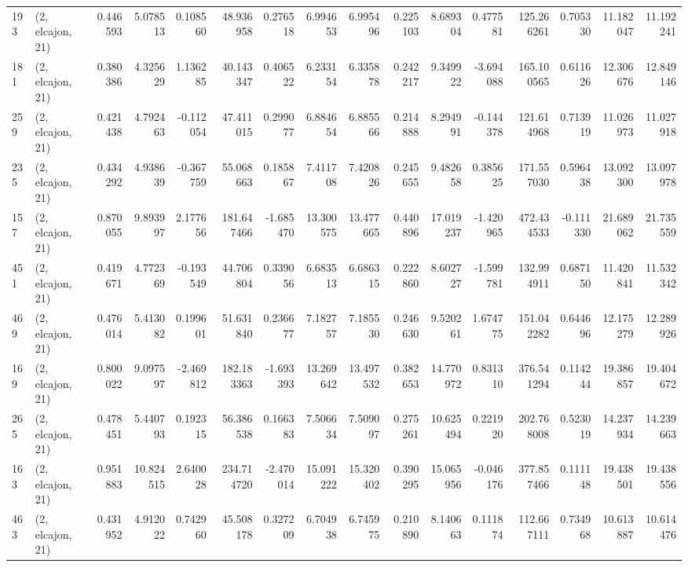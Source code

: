 \begin{tabular}{llrrrrrrrrrrrrrr}
193 &  (2, elcajon, 21) &   0.446593 &   5.078513 &   0.108560 &    48.936958 &   0.276518 &   6.994653 &   6.995496 &  0.225103 &   8.689304 &   0.477581 &   125.266261 &   0.705330 &  11.182047 &  11.192241 \\
181 &  (2, elcajon, 21) &   0.380386 &   4.325629 &   1.136285 &    40.143347 &   0.406522 &   6.233154 &   6.335878 &  0.242217 &   9.349922 &  -3.694088 &   165.100565 &   0.611626 &  12.306676 &  12.849146 \\
259 &  (2, elcajon, 21) &   0.421438 &   4.792463 &  -0.112054 &    47.411015 &   0.299077 &   6.884654 &   6.885566 &  0.214888 &   8.294991 &  -0.144378 &   121.614968 &   0.713919 &  11.026973 &  11.027918 \\
235 &  (2, elcajon, 21) &   0.434292 &   4.938639 &  -0.367759 &    55.068663 &   0.185867 &   7.411708 &   7.420826 &  0.245655 &   9.482658 &   0.385625 &   171.557030 &   0.596438 &  13.092300 &  13.097978 \\
157 &  (2, elcajon, 21) &   0.870055 &   9.893997 &   2.177656 &   181.647466 &  -1.685470 &  13.300575 &  13.477665 &  0.440896 &  17.019237 &  -1.420965 &   472.434533 &  -0.111330 &  21.689062 &  21.735559 \\
451 &  (2, elcajon, 21) &   0.419671 &   4.772369 &  -0.193549 &    44.706804 &   0.339056 &   6.683513 &   6.686315 &  0.222860 &   8.602727 &  -1.599781 &   132.994911 &   0.687150 &  11.420841 &  11.532342 \\
469 &  (2, elcajon, 21) &   0.476014 &   5.413082 &   0.199601 &    51.631840 &   0.236677 &   7.182757 &   7.185530 &  0.246630 &   9.520261 &   1.674775 &   151.042282 &   0.644696 &  12.175279 &  12.289926 \\
169 &  (2, elcajon, 21) &   0.800022 &   9.097597 &  -2.469812 &   182.183363 &  -1.693393 &  13.269642 &  13.497532 &  0.382653 &  14.770972 &   0.831310 &   376.541294 &   0.114244 &  19.386857 &  19.404672 \\
265 &  (2, elcajon, 21) &   0.478451 &   5.440793 &   0.192315 &    56.386538 &   0.166383 &   7.506634 &   7.509097 &  0.275261 &  10.625494 &   0.221920 &   202.768008 &   0.523019 &  14.237934 &  14.239663 \\
163 &  (2, elcajon, 21) &   0.951883 &  10.824515 &   2.640028 &   234.714720 &  -2.470014 &  15.091222 &  15.320402 &  0.390295 &  15.065956 &  -0.046176 &   377.857466 &   0.111148 &  19.438501 &  19.438556 \\
463 &  (2, elcajon, 21) &   0.431952 &   4.912022 &   0.742960 &    45.508178 &   0.327209 &   6.704938 &   6.745975 &  0.210890 &   8.140663 &   0.111874 &   112.667111 &   0.734968 &  10.613887 &  10.614476 \\

\end{tabular}
